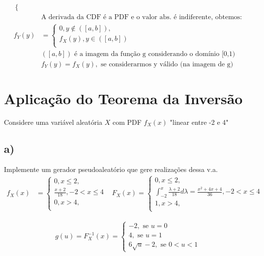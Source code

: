 \documentclass{article}
\begin{document}
\begin{align*}
\begin{cases}
        \end{cases} \\
        & \text{A derivada da CDF é a PDF e o valor abs. é indiferente, obtemos:} \\
    f_Y(y) &=
        \begin{cases}
            0, y \notin ([a,b]), \\[0.5em]
            f_X(y), y \in ([a,b]) \\
        \end{cases} \\
        & ([a,b]) \text{ é a imagem da função g considerando o domínio [0,1)} \\
        & f_Y(y) = f_X(y), \text{ se considerarmos y válido (na imagem de g)}
\end{align*}

\newpage
\section{Aplicação do Teorema da Inversão}
Considere uma variável aleatória $X$ com PDF $f_X(x)$ "linear entre -2 e 4"

\subsection*{a)} Implemente um gerador pseudoaleatório que gere realizações dessa v.a.
\begin{align*}
    f_X(x) &=
        \begin{cases}
            0, x \leq 2, \\
            \frac{x+2}{18}, -2 < x \leq 4 \\
            0, x > 4, \\
        \end{cases}
    &F_X(x) =
        \begin{cases}
            0, x \leq 2, \\
            \int_{-2}^x \frac{\lambda + 2}{18} d\lambda = \frac{x^2+4x+4}{36}, -2 < x \leq 4 \\
            1, x > 4, \\
        \end{cases}
\end{align*}

\begin{align*}
    g(u) = F_X^{-1}(x) =
        \begin{cases}
            -2, \text{ se } u = 0 \\
            4, \text{ se } u = 1 \\
            6 \sqrt{u} - 2, \text{ se } 0 < u < 1
        \end{cases}
\end{align*}
\end{document}
